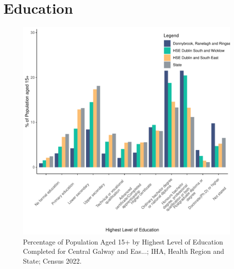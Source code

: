 \documentclass{article}
\begin{document}
\section{Education}\label{sect:Edu}
\begin{figure}[H]
	\centering
	\includegraphics[width = 120mm]{../figures/EduED.pdf}
	\caption{Percentage of Population Aged 15+ by Highest Level of Education Completed for Central Galway and Eas...; IHA, Health Region and State; Census 2022.}
	\label{fig:vbnv}
	\end{figure}
\end{document}
